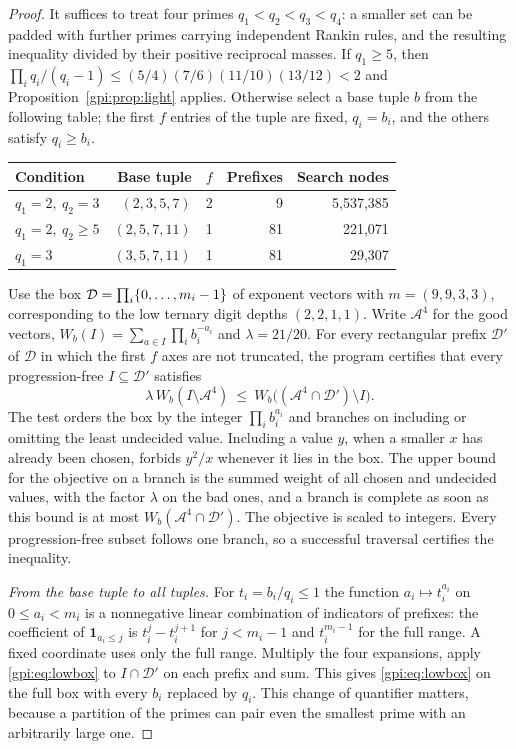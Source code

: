 \begin{proof}
It suffices to treat four primes $q_1<q_2<q_3<q_4$: a smaller set can be padded with further
primes carrying independent Rankin rules, and the resulting inequality divided by their
positive reciprocal masses. If $q_1\ge5$, then
$\prod_iq_i/(q_i-1)\le(5/4)(7/6)(11/10)(13/12)<2$ and Proposition~\ref{gpi:prop:light} applies.
Otherwise select a base tuple $b$ from the following table; the first $f$ entries of the
tuple are fixed, $q_i=b_i$, and the others satisfy $q_i\ge b_i$.
\begin{center}\small
\begin{tabular}{lrrrr}
\toprule
Condition & Base tuple & $f$ & Prefixes & Search nodes\\ \midrule
$q_1=2,\ q_2=3$ & $(2,3,5,7)$ & 2 & 9 & 5{,}537{,}385\\
$q_1=2,\ q_2\ge5$ & $(2,5,7,11)$ & 1 & 81 & 221{,}071\\
$q_1=3$ & $(3,5,7,11)$ & 1 & 81 & 29{,}307\\ \bottomrule
\end{tabular}
\end{center}
Use the box $\mathcal D=\prod_i\{0,\dots,m_i-1\}$ of exponent vectors with $m=(9,9,3,3)$,
corresponding to the low ternary digit depths $(2,2,1,1)$. Write $\mathcal A^4$ for the good
vectors, $W_b(I)=\sum_{a\in I}\prod_ib_i^{-a_i}$ and $\lambda=21/20$. For every rectangular
prefix $\mathcal D'$ of $\mathcal D$ in which the first $f$ axes are not truncated, the
program
certifies that every progression-free $I\subseteq\mathcal D'$ satisfies
\begin{equation}\label{gpi:eq:lowbox}
 \lambda\,W_b(I\setminus\mathcal A^4)\ \le\ W_b\bigl((\mathcal A^4\cap\mathcal D')\setminus I\bigr).
\end{equation}
The test orders the box by the integer $\prod_ib_i^{a_i}$ and branches on including or
omitting the least undecided value. Including a value $y$, when a smaller $x$ has already
been chosen, forbids $y^2/x$ whenever it lies in the box. The upper bound for the objective
on a branch is the summed weight of all chosen and undecided values, with the factor
$\lambda$ on the bad ones, and a branch is complete as soon as this bound is at most
$W_b(\mathcal A^4\cap\mathcal D')$. The objective is scaled to integers. Every
progression-free subset follows one branch, so a successful traversal certifies the
inequality.

\emph{From the base tuple to all tuples.} For $t_i=b_i/q_i\le1$ the function
$a_i\mapsto t_i^{a_i}$ on $0\le a_i<m_i$ is a nonnegative linear combination of indicators of
prefixes: the coefficient of $\mathbf 1_{a_i\le j}$ is $t_i^j-t_i^{j+1}$ for $j<m_i-1$ and
$t_i^{m_i-1}$ for the full range. A fixed coordinate uses only the full range. Multiply the
four expansions, apply \eqref{gpi:eq:lowbox} to $I\cap\mathcal D'$ on each prefix and sum.
This gives \eqref{gpi:eq:lowbox} on the full box with every $b_i$ replaced by $q_i$. This
change of quantifier matters, because a partition of the primes can pair even the smallest
prime with an arbitrarily large one.


\end{proof}
